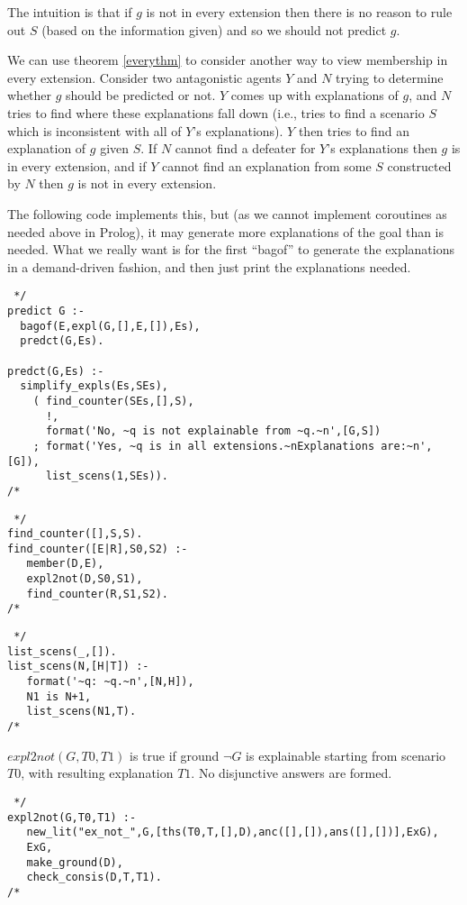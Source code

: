 The intuition is that
if $g$ is not in every extension then there is no reason to rule out
$S$ (based on the information given) and so we should not predict $g$.

We can use theorem \ref{everythm} to consider another way to view membership
in every extension. Consider two antagonistic agents $Y$ and $N$ trying to
determine whether $g$ should be predicted or not. $Y$ comes
up with explanations of $g$, and $N$ tries to find where these explanations
fall down (i.e., tries to find a scenario $S$ which is inconsistent with
all of $Y$'s explanations). $Y$ then tries to find an explanation of $g$
given $S$.
If $N$ cannot find a defeater for $Y$'s explanations then
$g$ is in every extension, and if $Y$ cannot find an explanation from
some $S$ constructed by $N$ then $g$ is not in every extension.

The following code implements this, but (as we cannot implement
coroutines as needed above in Prolog), it may generate more
explanations of the goal than is needed. What we really want is for the
first ``bagof'' to generate the explanations in a demand-driven fashion,
and then just print the explanations needed.

\begin{verbatim} */
predict G :-
  bagof(E,expl(G,[],E,[]),Es),
  predct(G,Es). 
 
predct(G,Es) :- 
  simplify_expls(Es,SEs),
    ( find_counter(SEs,[],S),
      !,
      format('No, ~q is not explainable from ~q.~n',[G,S])
    ; format('Yes, ~q is in all extensions.~nExplanations are:~n',[G]),
      list_scens(1,SEs)).
/* \end{verbatim}

\begin{verbatim} */
find_counter([],S,S).
find_counter([E|R],S0,S2) :-
   member(D,E),
   expl2not(D,S0,S1),
   find_counter(R,S1,S2).
/* \end{verbatim}

\begin{verbatim} */
list_scens(_,[]).
list_scens(N,[H|T]) :-
   format('~q: ~q.~n',[N,H]),
   N1 is N+1,
   list_scens(N1,T).
/* \end{verbatim}

$expl2not(G,T0,T1)$ is true if ground $\neg G$ is explainable starting from
scenario $T0$, with resulting explanation $T1$. No disjunctive answers are
formed.
\begin{verbatim} */
expl2not(G,T0,T1) :-
   new_lit("ex_not_",G,[ths(T0,T,[],D),anc([],[]),ans([],[])],ExG),
   ExG,
   make_ground(D),
   check_consis(D,T,T1).
/* \end{verbatim}

